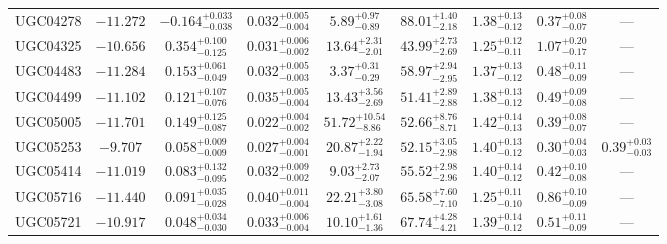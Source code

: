 \documentclass[twocolumn,tighten]{aastex63}
\begin{document}
\begin{table}
\begin{center}
\begin{tabular}{lcccccccc}
   UGC04278 & $ -11.272 $ & $ -0.164 _{ -0.038 } ^{ + 0.033 } $ & $ 0.032 _{ -0.004 } ^{ + 0.005 } $ & $ 5.89 _{ -0.89 } ^{ + 0.97 } $ & $ 88.01 _{ -2.18 } ^{ + 1.40 } $ & $ 1.38 _{ -0.12 } ^{ + 0.13 } $ & $ 0.37 _{ -0.07 } ^{ + 0.08 } $ & --- \\  
   UGC04325 & $ -10.656 $ & $ 0.354 _{ -0.125 } ^{ + 0.100 } $ & $ 0.031 _{ -0.002 } ^{ + 0.006 } $ & $ 13.64 _{ -2.01 } ^{ + 2.31 } $ & $ 43.99 _{ -2.69 } ^{ + 2.73 } $ & $ 1.25 _{ -0.11 } ^{ + 0.12 } $ & $ 1.07 _{ -0.17 } ^{ + 0.20 } $ & --- \\  
   UGC04483 & $ -11.284 $ & $ 0.153 _{ -0.049 } ^{ + 0.061 } $ & $ 0.032 _{ -0.003 } ^{ + 0.005 } $ & $ 3.37 _{ -0.29 } ^{ + 0.31 } $ & $ 58.97 _{ -2.95 } ^{ + 2.94 } $ & $ 1.37 _{ -0.12 } ^{ + 0.13 } $ & $ 0.48 _{ -0.09 } ^{ + 0.11 } $ & --- \\  
   UGC04499 & $ -11.102 $ & $ 0.121 _{ -0.076 } ^{ + 0.107 } $ & $ 0.035 _{ -0.004 } ^{ + 0.005 } $ & $ 13.43 _{ -2.69 } ^{ + 3.56 } $ & $ 51.41 _{ -2.88 } ^{ + 2.89 } $ & $ 1.38 _{ -0.12 } ^{ + 0.13 } $ & $ 0.49 _{ -0.08 } ^{ + 0.09 } $ & --- \\  
   UGC05005 & $ -11.701 $ & $ 0.149 _{ -0.087 } ^{ + 0.125 } $ & $ 0.022 _{ -0.002 } ^{ + 0.004 } $ & $ 51.72 _{ -8.86 } ^{ + 10.54 } $ & $ 52.66 _{ -8.71 } ^{ + 8.76 } $ & $ 1.42 _{ -0.13 } ^{ + 0.14 } $ & $ 0.39 _{ -0.07 } ^{ + 0.08 } $ & --- \\  
   UGC05253 & $ -9.707  $ & $ 0.058 _{ -0.009 } ^{ + 0.009 } $ & $ 0.027 _{ -0.001 } ^{ + 0.004 } $ & $ 20.87 _{ -1.94 } ^{ + 2.22 } $ & $ 52.15 _{ -2.98 } ^{ + 3.05 } $ & $ 1.40 _{ -0.12 } ^{ + 0.13 } $ & $ 0.30 _{ -0.03 } ^{ + 0.04 } $ & $ 0.39 _{ -0.03 } ^{ + 0.03 } $  \\  
   UGC05414 & $ -11.019 $ & $ 0.083 _{ -0.095 } ^{ + 0.132 } $ & $ 0.032 _{ -0.002 } ^{ + 0.009 } $ & $ 9.03 _{ -2.07 } ^{ + 2.73 } $ & $ 55.52 _{ -2.96 } ^{ + 2.98 } $ & $ 1.40 _{ -0.12 } ^{ + 0.14 } $ & $ 0.42 _{ -0.08 } ^{ + 0.10 } $ & --- \\  
   UGC05716 & $ -11.440 $ & $ 0.091 _{ -0.028 } ^{ + 0.035 } $ & $ 0.040 _{ -0.004 } ^{ + 0.011 } $ & $ 22.21 _{ -3.08 } ^{ + 3.80 } $ & $ 65.58 _{ -7.10 } ^{ + 7.60 } $ & $ 1.25 _{ -0.10 } ^{ + 0.11 } $ & $ 0.86 _{ -0.09 } ^{ + 0.10 } $ & --- \\  
   UGC05721 & $ -10.917 $ & $ 0.048 _{ -0.030 } ^{ + 0.034 } $ & $ 0.033 _{ -0.004 } ^{ + 0.006 } $ & $ 10.10 _{ -1.36 } ^{ + 1.61 } $ & $ 67.74 _{ -4.21 } ^{ + 4.28 } $ & $ 1.39 _{ -0.12 } ^{ + 0.14 } $ & $ 0.51 _{ -0.09 } ^{ + 0.11 } $ & --- \\  

\end{tabular}
\end{center}
\end{table}
\end{document}
